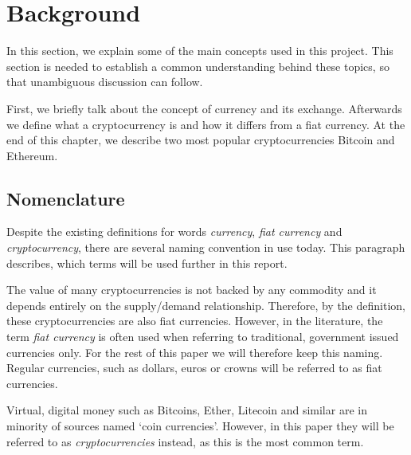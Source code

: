\section{Background}\label{sec:background}
% 
In this section, we explain some of the main concepts used in this project. This section is needed to establish a common understanding behind these topics, so that unambiguous discussion can follow.

First, we briefly talk about the concept of currency and its exchange. Afterwards we define what a cryptocurrency is and how it differs from a fiat currency. At the end of this chapter, we describe two most popular cryptocurrencies Bitcoin and Ethereum.
% 

% 

% 

% 

% 


\subsection{Nomenclature}
Despite the existing definitions for words \textit{currency}, \textit{fiat currency} and \textit{cryptocurrency}, there are several naming convention in use today. This paragraph describes, which terms will be used further in this report.

The value of many cryptocurrencies is not backed by any commodity and it depends entirely on the supply/demand relationship. Therefore, by the definition, these cryptocurrencies are also fiat currencies. However, in the literature, the term \emph{fiat currency} is often used when referring to traditional, government issued currencies only. For the rest of this paper we will therefore keep this naming. Regular currencies, such as dollars, euros or crowns will be referred to as fiat currencies.

Virtual, digital money such as Bitcoins, Ether, Litecoin and similar are in minority of sources named `coin currencies'. However, in this paper they will be referred to as \textit{cryptocurrencies} instead, as this is the most common term.